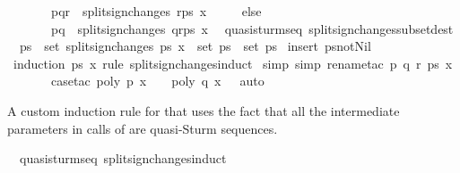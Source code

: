 \begin{isabellebody}
\ \ \ \ \ \ \ {\isacharbrackleft}p{\isacharcomma}q{\isacharcomma}r{\isacharbrackright}\ {\isacharhash}\ split{\isacharunderscore}sign{\isacharunderscore}changes\ {\isacharparenleft}r{\isacharhash}ps{\isacharparenright}\ x\isanewline
\ \ \ \ \ else\isanewline
\ \ \ \ \ \ \ {\isacharbrackleft}p{\isacharcomma}q{\isacharbrackright}\ {\isacharhash}\ split{\isacharunderscore}sign{\isacharunderscore}changes\ {\isacharparenleft}q{\isacharhash}r{\isacharhash}ps{\isacharparenright}\ x{\isacharparenright}{\isachardoublequoteclose}\isanewline
\isanewline
{}\isamarkupfalse%
\ {\isacharparenleft}\ quasi{\isacharunderscore}sturm{\isacharunderscore}seq{\isacharparenright}\ split{\isacharunderscore}sign{\isacharunderscore}changes{\isacharunderscore}subset{\isacharbrackleft}dest{\isacharbrackright}{\isacharcolon}\isanewline
\ \ {\isachardoublequoteopen}ps{\isacharprime}\ {\isasymin}\ set\ {\isacharparenleft}split{\isacharunderscore}sign{\isacharunderscore}changes\ ps\ x{\isacharparenright}\ {\isasymLongrightarrow}\ set\ ps{\isacharprime}\ {\isasymsubseteq}\ set\ ps{\isachardoublequoteclose}\isanewline
%
\isadelimproof
%
\endisadelimproof
%
\isatagproof
{}\isamarkupfalse%
\ {\isacharparenleft}insert\ ps{\isacharunderscore}not{\isacharunderscore}Nil{\isacharparenright}\isanewline
{}\isamarkupfalse%
\ {\isacharparenleft}induction\ ps\ x\ rule{\isacharcolon}\ split{\isacharunderscore}sign{\isacharunderscore}changes{\isachardot}induct{\isacharparenright}\isanewline
{}\isamarkupfalse%
\ {\isacharparenleft}simp{\isacharcomma}\ simp{\isacharcomma}\ rename{\isacharunderscore}tac\ p\ q\ r\ ps\ x{\isacharcomma}\ \isanewline
\ \ \ \ \ \ \ case{\isacharunderscore}tac\ {\isachardoublequoteopen}poly\ p\ x\ {\isasymnoteq}\ {}\ {\isasymand}\ poly\ q\ x\ {\isacharequal}\ {}{\isachardoublequoteclose}{\isacharcomma}\ auto{\isacharparenright}\isanewline
{}\isamarkupfalse%
%
\endisatagproof
{\isafoldproof}%
%
\isadelimproof
%
\endisadelimproof
%
\begin{isamarkuptext}%
A custom induction rule for  that 
  uses the fact that all the intermediate parameters in calls 
  of  are quasi-Sturm sequences.%
\end{isamarkuptext}%
\isamarkuptrue%
\isamarkupfalse%
\ {\isacharparenleft}\ quasi{\isacharunderscore}sturm{\isacharunderscore}seq{\isacharparenright}\ split{\isacharunderscore}sign{\isacharunderscore}changes{\isacharunderscore}induct{\isacharcolon}\isanewline

\end{isabellebody}
